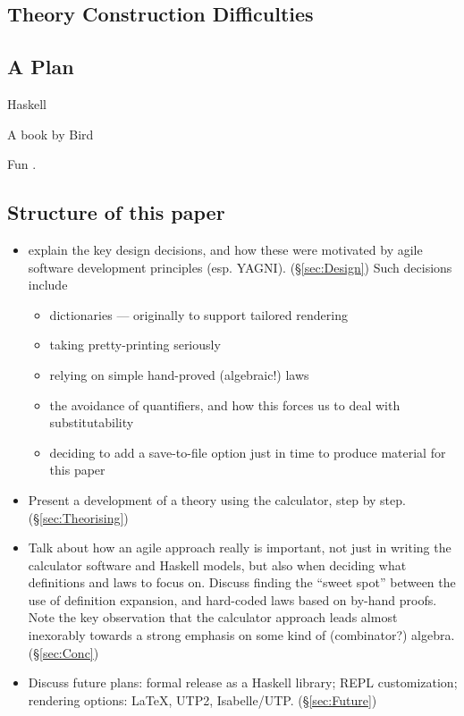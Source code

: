 \subsection{Theory Construction Difficulties}

\subsection{A Plan}

Haskell\cite{Haskell2010}

A book by Bird \cite{Bird14}

Fun \cite{conf/esop/Rudiak-GouldMJ06}.


\subsection{Structure of this paper}

\begin{itemize}
  \item
     explain the key design decisions,
     and how these were motivated by agile software development
     principles (esp. YAGNI). (\S\ref{sec:Design})
     Such decisions include
     \begin{itemize}
       \item dictionaries --- originally to support tailored rendering
       \item taking pretty-printing seriously
       \item relying on simple hand-proved (algebraic!) laws
       \item the avoidance of quantifiers,
        and how this forces us to deal with substitutability
       \item deciding to add a save-to-file option
        just in time to produce material for this paper
     \end{itemize}
  \item
     Present a development of a theory using the calculator,
     step by step.(\S\ref{sec:Theorising})
  \item
    Talk about how an agile approach really is important,
    not just in writing the calculator software and Haskell models,
    but also when deciding what definitions and laws to focus on.
    Discuss finding the ``sweet spot'' between the use of definition
    expansion, and hard-coded laws based on by-hand proofs.
    Note the key observation that the calculator approach
    leads almost inexorably towards a strong emphasis
    on some kind of (combinator?) algebra. (\S\ref{sec:Conc})
  \item
    Discuss future plans: formal release as a Haskell library;
    REPL customization; rendering options: \LaTeX, UTP2, Isabelle/UTP.
    (\S\ref{sec:Future})
\end{itemize}
